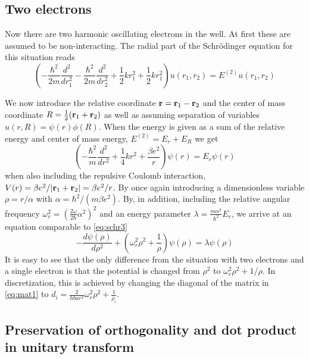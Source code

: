 \documentclass[10pt, a4paper]{amsart}
\begin{document}
\subsection{Two electrons}
Now  there are two harmonic oscillating electrons in the well. At first these are assumed to be non-interacting. The radial part of the Schrödinger equation for this situation reads
\begin{equation}
\left(-\frac{\hbar^2}{2m}\frac{d^2}{dr_1^2} -\frac{\hbar^2}{2m}\frac{d^2}{dr_2^2} +\frac{1}{2}kr_1^2+\frac{1}{2}kr_1^2 \right)u(r_1,r_2)=E^{(2)}u(r_1,r_2)
\end{equation}

We now introduce the relative coordinate $\vb{r} = \vb{r}_1 - \vb{r}_2$ and the center of mass coordinate $R=\frac{1}{2}(\vb{r}_1+\vb{r}_2)$ as well as assuming separation of variables $u(r,R)=\psi(r)\phi(R)$. When the energy is given as a sum of the relative energy and center of mass energy, $E^{(2)}=E_r+E_R$ we get
\begin{equation}
\label{eq:radialschr2}
\left(-\frac{\hbar^2}{m}\frac{d^2}{dr^2}+\frac{1}{4}kr^2+\frac{\beta e^2}{r} \right)\psi(r)=E_r\psi(r)
\end{equation}
when also including the repulsive Coulomb interaction, $V(r) = \beta e^2/\abs{\vb{r}_1+\vb{r}_2}= \beta e^2/r$. By once again introducing a dimensionless variable $\rho=r/\alpha$ with $\alpha=\hbar^2/(m\beta e^2)$. By, in addition, including the relative angular frequency $\omega_r^2=(\frac{2\omega}{2\hbar}\alpha^2)^2$ and an energy parameter $\lambda=\frac{m\alpha^2}{\hbar^2}E_r$, we arrive at an equation comparable to \ref{eq:schr3}
\begin{equation}
-\frac{d\psi(\rho)}{d\rho^2}+\left(\omega^2_r\rho^2 + \frac{1}{\rho} \right) \psi(\rho)= \lambda\psi(\rho)
\end{equation}
It is easy to see that the only difference from the situation with two electrons and a single electron is that the potential is changed from $\rho^2$ to $\omega_r^2\rho^2+1/\rho$. In discretization, this is achieved by changing the diagonal of the matrix in \ref{eq:mat1} to $d_i = \frac{2}{hbar^2} \omega_r^2\rho^2+\frac{1}{\rho_i}$.

\subsection{Preservation of orthogonality and dot product in unitary transform}
\end{document}
